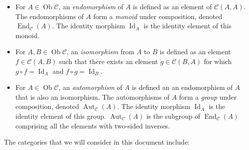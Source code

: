 \begin{itemize}
\item For $A \in \operatorname{Ob}\mathcal{C}$, an {\em endomorphism}
  of $A$ is defined as an element of $\mathcal{C}(A,A)$. The
  endomorphisms of $A$ form a {\em monoid} under composition, denoted
  $\operatorname{End}_{\mathcal{C}}(A)$. The identity morphism
  $\operatorname{Id}_A$ is the identity element of this monoid.
\item For $A,B \in \operatorname{Ob}\mathcal{C}$, an {\em isomorphism}
  from $A$ to $B$ is defined as an element $f \in \mathcal{C}(A,B)$
  such that there exists an element $g \in \mathcal{C}(B,A)$ for which
  $g \circ f = \operatorname{Id}_A$ and $f \circ g =
  \operatorname{Id}_B$.
\item For $A \in \operatorname{Ob}\mathcal{C}$, an {\em automorphism}
  of $A$ is defined an an endomorphism of $A$ that is also an
  isomorphism. The automorphisms of $A$ form a {\em group} under
  composition, denoted $\operatorname{Aut}_{\mathcal{C}}(A)$. The
  identity morphism $\operatorname{Id}_A$ is the identity element of
  this group. $\operatorname{Aut}_{\mathcal{C}}(A)$ is the subgroup of
  $\operatorname{End}_{\mathcal{C}}(A)$ comprising all the elements
  with two-sided inverses.
\end{itemize}

The categories that we will consider in this document include:

